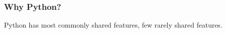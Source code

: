 

\begin{frame}[fragile]
\frametitle{Why Python?}
\begin{footnotesize}Python has most commonly shared features, few rarely shared features.\end{footnotesize}
\begin{columns}[t] %


\end{columns}


\end{frame}


